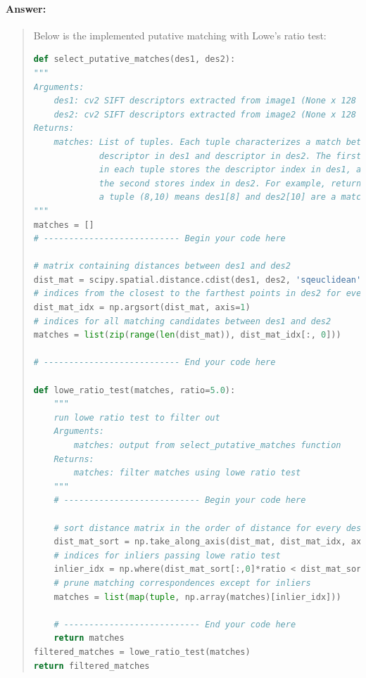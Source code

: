 \documentclass[11pt]{article}
\begin{document}
\paragraph{Answer:} 
\begin{quote}
Below is the implemented putative matching with Lowe's ratio test:

\begin{lstlisting}[language=Python, basicstyle=\scriptsize]
def select_putative_matches(des1, des2):
"""
Arguments:
    des1: cv2 SIFT descriptors extracted from image1 (None x 128 matrix)
    des2: cv2 SIFT descriptors extracted from image2 (None x 128 matrix)
Returns:
    matches: List of tuples. Each tuple characterizes a match between 
             descriptor in des1 and descriptor in des2. The first item
             in each tuple stores the descriptor index in des1, and 
             the second stores index in des2. For example, returning 
             a tuple (8,10) means des1[8] and des2[10] are a match.
"""
matches = []
# --------------------------- Begin your code here 

# matrix containing distances between des1 and des2
dist_mat = scipy.spatial.distance.cdist(des1, des2, 'sqeuclidean')
# indices from the closest to the farthest points in des2 for every des1
dist_mat_idx = np.argsort(dist_mat, axis=1)
# indices for all matching candidates between des1 and des2
matches = list(zip(range(len(dist_mat)), dist_mat_idx[:, 0]))

# --------------------------- End your code here   

def lowe_ratio_test(matches, ratio=5.0):
    """
    run lowe ratio test to filter out 
    Arguments: 
        matches: output from select_putative_matches function
    Returns:
        matches: filter matches using lowe ratio test
    """
    # --------------------------- Begin your code here
    
    # sort distance matrix in the order of distance for every des1
    dist_mat_sort = np.take_along_axis(dist_mat, dist_mat_idx, axis=1)
    # indices for inliers passing lowe ratio test
    inlier_idx = np.where(dist_mat_sort[:,0]*ratio < dist_mat_sort[:,1])[0]
    # prune matching correspondences except for inliers
    matches = list(map(tuple, np.array(matches)[inlier_idx]))

    # --------------------------- End your code here
    return matches
filtered_matches = lowe_ratio_test(matches)
return filtered_matches
\end{lstlisting}


\end{quote}
\end{document}
